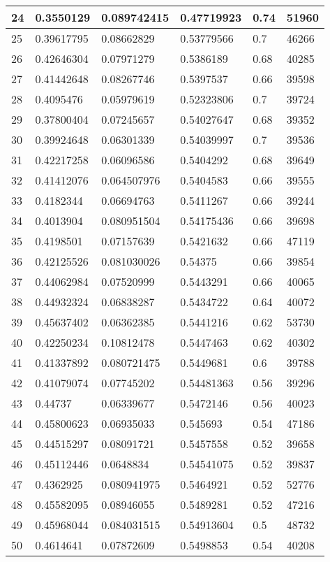 \begin{longtable}{|l|l|l|l|l|l|}
24 & 0.3550129 & 0.089742415 & 0.47719923 & 0.74 & 51960 \\ \hline 
25 & 0.39617795 & 0.08662829 & 0.53779566 & 0.7 & 46266 \\ \hline 
26 & 0.42646304 & 0.07971279 & 0.5386189 & 0.68 & 40285 \\ \hline 
27 & 0.41442648 & 0.08267746 & 0.5397537 & 0.66 & 39598 \\ \hline 
28 & 0.4095476 & 0.05979619 & 0.52323806 & 0.7 & 39724 \\ \hline 
29 & 0.37800404 & 0.07245657 & 0.54027647 & 0.68 & 39352 \\ \hline 
30 & 0.39924648 & 0.06301339 & 0.54039997 & 0.7 & 39536 \\ \hline 
31 & 0.42217258 & 0.06096586 & 0.5404292 & 0.68 & 39649 \\ \hline 
32 & 0.41412076 & 0.064507976 & 0.5404583 & 0.66 & 39555 \\ \hline 
33 & 0.4182344 & 0.06694763 & 0.5411267 & 0.66 & 39244 \\ \hline 
34 & 0.4013904 & 0.080951504 & 0.54175436 & 0.66 & 39698 \\ \hline 
35 & 0.4198501 & 0.07157639 & 0.5421632 & 0.66 & 47119 \\ \hline 
36 & 0.42125526 & 0.081030026 & 0.54375 & 0.66 & 39854 \\ \hline 
37 & 0.44062984 & 0.07520999 & 0.5443291 & 0.66 & 40065 \\ \hline 
38 & 0.44932324 & 0.06838287 & 0.5434722 & 0.64 & 40072 \\ \hline 
39 & 0.45637402 & 0.06362385 & 0.5441216 & 0.62 & 53730 \\ \hline 
40 & 0.42250234 & 0.10812478 & 0.5447463 & 0.62 & 40302 \\ \hline 
41 & 0.41337892 & 0.080721475 & 0.5449681 & 0.6 & 39788 \\ \hline 
42 & 0.41079074 & 0.07745202 & 0.54481363 & 0.56 & 39296 \\ \hline 
43 & 0.44737 & 0.06339677 & 0.5472146 & 0.56 & 40023 \\ \hline 
44 & 0.45800623 & 0.06935033 & 0.545693 & 0.54 & 47186 \\ \hline 
45 & 0.44515297 & 0.08091721 & 0.5457558 & 0.52 & 39658 \\ \hline 
46 & 0.45112446 & 0.0648834 & 0.54541075 & 0.52 & 39837 \\ \hline 
47 & 0.4362925 & 0.080941975 & 0.5464921 & 0.52 & 52776 \\ \hline 
48 & 0.45582095 & 0.08946055 & 0.5489281 & 0.52 & 47216 \\ \hline 
49 & 0.45968044 & 0.084031515 & 0.54913604 & 0.5 & 48732 \\ \hline 
50 & 0.4614641 & 0.07872609 & 0.5498853 & 0.54 & 40208 \\ \hline 
\end{longtable}